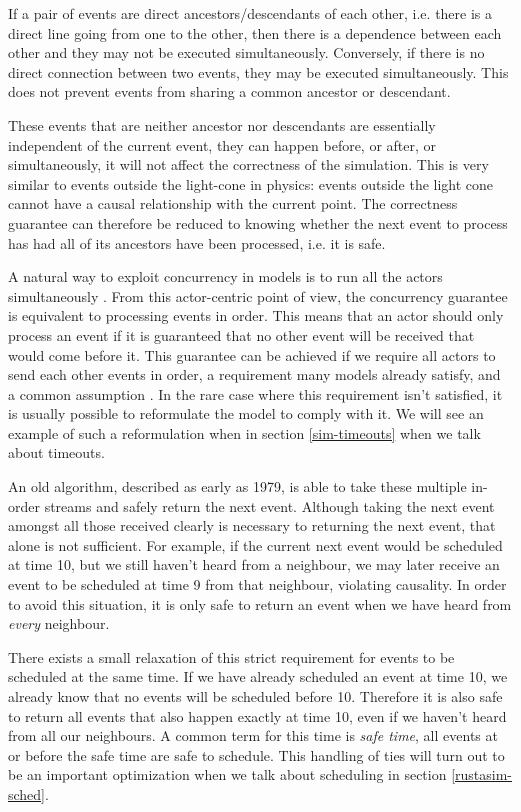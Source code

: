 If a pair of events are direct ancestors/descendants of each other, i.e. there is a direct line going from one to the other, then there is a dependence between each other and they may not be executed simultaneously.
Conversely, if there is no direct connection between two events, they may be executed simultaneously.
This does not prevent events from sharing a common ancestor or descendant.

These events that are neither ancestor nor descendants are essentially independent of the current event, they can happen before, or after, or simultaneously, it will not affect the correctness of the simulation.
This is very similar to events outside the light-cone in physics: events outside the light cone cannot have a causal relationship with the current point.
The correctness guarantee can therefore be reduced to knowing whether the next event to process has had all of its ancestors have been processed, i.e. it is safe.

A natural way to exploit concurrency in models is to run all the actors simultaneously \cite{misra_distributed_1986}.
From this actor-centric point of view, the concurrency guarantee is equivalent to processing events in order.
This means that an actor should only process an event if it is guaranteed that no other event will be received that would come before it.
This guarantee can be achieved if we require all actors to send each other events in order, a requirement many models already satisfy, and a common assumption \cite{fujimoto_parallel_2001}.
In the rare case where this requirement isn't satisfied, it is usually possible to reformulate the model to comply with it.
We will see an example of such a reformulation when in section \ref{sim-timeouts} when we talk about timeouts.

An old algorithm, described as early as 1979\cite{fujimoto_parallel_2000}\cite{misra_distributed_1986}, is able to take these multiple in-order streams and safely return the next event.
Although taking the next event amongst all those received clearly is necessary to returning the next event, that alone is not sufficient.
For example, if the current next event would be scheduled at time 10, but we still haven't heard from a neighbour, we may later receive an event to be scheduled at time 9 from that neighbour, violating causality.
In order to avoid this situation, it is only safe to return an event when we have heard from \emph{every} neighbour.

There exists a small relaxation of this strict requirement for events to be scheduled at the same time.
If we have already scheduled an event at time 10, we already know that no events will be scheduled before 10.
Therefore it is also safe to return all events that also happen exactly at time 10, even if we haven't heard from all our neighbours.
A common term for this time is \emph{safe time}, all events at or before the safe time are safe to schedule.
This handling of ties will turn out to be an important optimization when we talk about scheduling in section \ref{rustasim-sched}. %

